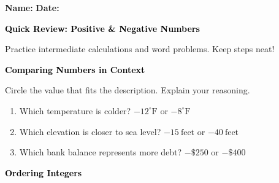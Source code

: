 \documentclass[12pt, letterpaper, fleql]{article}
\begin{document}
\textbf{Name:} \underline{\hspace{5cm}}
\hfill
\textbf{Date:} \underline{\hspace{3cm}}\\

\begin{tcolorbox}[colback=black!10]
    \large\textcolor{black}{\textbf{Quick Review: Positive \& Negative Numbers}}
\end{tcolorbox}

\vspace{3mm}
\noindent
Practice intermediate calculations and word problems. Keep steps neat!

\vspace{4mm}

\begin{tcolorbox}[colback=black!10]
\large\textcolor{black}{\textbf{Comparing Numbers in Context}}
\end{tcolorbox}

\noindent
Circle the value that fits the description. Explain your reasoning.

\vspace{3mm}
\begin{enumerate}[itemsep=2.2cm, leftmargin=0.6cm]
\item Which temperature is colder? \quad $-12^\circ\text{F}$ \quad or \quad $-8^\circ\text{F}$

\vspace{2cm}

\item Which elevation is closer to sea level? \quad $-15\ \text{feet}$ \quad or \quad $-40\ \text{feet}$

\vspace{2cm}

\item Which bank balance represents more debt? \quad $-\$250$ \quad or \quad $-\$400$

\vspace{2cm}

\end{enumerate}

\newpage

\begin{tcolorbox}[colback=black!10]
\large\textcolor{black}{\textbf{Ordering Integers}}
\end{tcolorbox}
\end{document}
